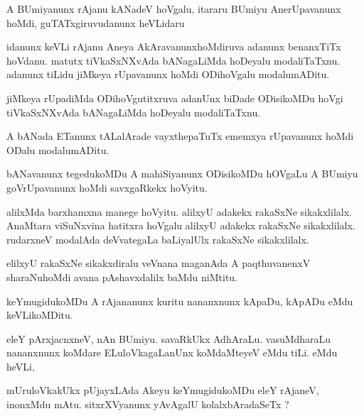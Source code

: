 \documentclass{article}
\begin{document}
\begin{mn}
A BUmiyanunx rAjanu kANadeV hoVgalu, itararu BUmiyu AnerUpavanunx  hoMdi, 
guTATxgiruvudanunx heVLidaru
\end{mn}

\begin{mn}
idanunx keVLi rAjanu Aneya AkAravanunxhoMdiruva adanunx benanxTiTx hoVdanu. 
matutx tiVkaSxNXvAda bANagaLiMda hoDeyalu modaliTaTxnu.  adanunx tiLidu 
jiMkeya rUpavanunx hoMdi ODihoVgalu modalumADitu.
\end{mn}

\begin{mn}
jiMkeya rUpadiMda ODihoVgutitxruva adanUnx biDade ODisikoMDu hoVgi tiVkaSxNXvAda 
bANagaLiMda hoDeyalu modaliTaTxnu.
\end{mn}

\begin{mn}
A bANada ETanunx tALalArade vayxthepaTuTx ememxya rUpavanunx hoMdi ODalu modalumADitu. 
\end{mn}

\begin{mn}
bANavanunx tegedukoMDu A mahiSiyanunx ODisikoMDu hOVgaLu A BUmiyu goVrUpavanunx 
hoMdi savxgaRkekx hoVyitu.
\end{mn}

\begin{mn}
alilxMda barxhamxna manege hoVyitu. alilxyU adakekx rakaSxNe sikakxlilalx. 
AnaMtara viSuNxvina hatitxra hoVgalu alilxyU adakekx rakaSxNe sikakxlilalx. 
rudarxneV modalAda deVvategaLa baLiyalUlx rakaSxNe sikakxlilalx.
\end{mn}

\begin{mn}
elilxyU rakaSxNe sikakxdiralu veVnana maganAda A paqthuvanenxV sharaNuhoMdi 
avana pAshavxdalilx baMdu niMtitu.
\end{mn}

\begin{mn}
keYmugidukoMDu A rAjananunx  kuritu nananxnunx kApaDu, kApADu eMdu keVLikoMDitu.
\end{mn}

\begin{mn}
eleY pArxjacnxneV, nAn BUmiyu.  savaRkUkx AdhAraLu. vasuMdharaLu nananxnunx koMdare 
ELuloVkagaLanUnx koMdaMteyeV eMdu tiLi. eMdu heVLi,
\end{mn}

\begin{mn}
mUruloVkakUkx pUjayxLAda Akeyu keYmugidukoMDu eleY rAjaneV, inonxMdu mAtu. 
sitxrXVyanunx yAvAgalU kolalxbAradaSeTx ?
\end{mn}
\end{document}
